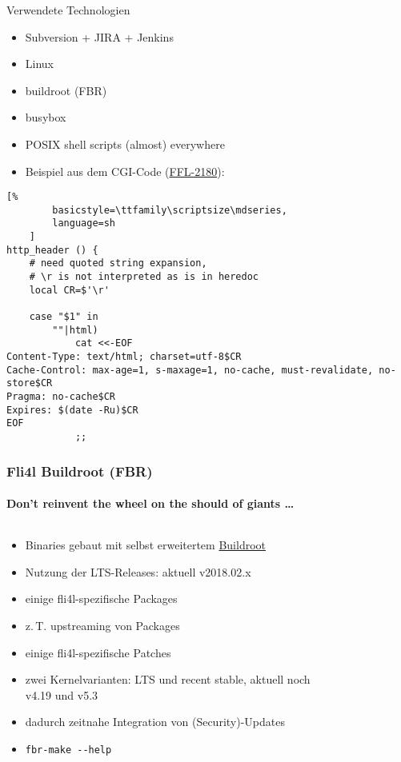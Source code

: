 \documentclass[t]{beamer}
\newcommand{\dashdash}[1]{-\hspace{0pt}-#1}
\begin{document}
\begin{frame}[fragile]{Verwendete Technologien}
    \begin{itemize}
        \item Subversion + JIRA + Jenkins
        \item Linux
        \item buildroot (FBR)
        \item busybox
        \item POSIX shell scripts (almost) everywhere
        \pause
        \item Beispiel aus dem CGI-Code
            (\href{https://web.nettworks.org/bugs/browse/FFL-2180}{FFL-2180}):
    \end{itemize}
    \begin{lstlisting}[%
        basicstyle=\ttfamily\scriptsize\mdseries,
        language=sh
    ]
http_header () {
    # need quoted string expansion,
    # \r is not interpreted as is in heredoc
    local CR=$'\r'

    case "$1" in
        ""|html)
            cat <<-EOF
Content-Type: text/html; charset=utf-8$CR
Cache-Control: max-age=1, s-maxage=1, no-cache, must-revalidate, no-store$CR
Pragma: no-cache$CR
Expires: $(date -Ru)$CR
EOF
            ;;
    \end{lstlisting}
\end{frame}

\begin{frame}[label=fbr]
    \frametitle{Fli4l Buildroot (FBR)}
    \framesubtitle{Don't reinvent the wheel on the should of giants …}
    \begin{columns}[T,onlytextwidth]
        \begin{column}{0.65\textwidth}
            \begin{itemize}
                \item Binaries gebaut mit selbst erweitertem \href{https://buildroot.org/}{Buildroot}
                \item Nutzung der LTS-Releases: aktuell v2018.02.x
                \item einige fli4l-spezifische Packages
                \item z.\,T. upstreaming von Packages
                \item einige fli4l-spezifische Patches
                \item zwei Kernelvarianten: LTS und recent stable, aktuell noch v4.19 und v5.3
                \item dadurch zeitnahe Integration von (Security)-Updates
                \item \texttt{fbr-make \dashdash{help}}
            \end{itemize}
        \end{column}
        \begin{column}{0.35\textwidth}
            \begin{figure}
            \end{figure}
        \end{column}
    \end{columns}
\end{frame}
\end{document}
